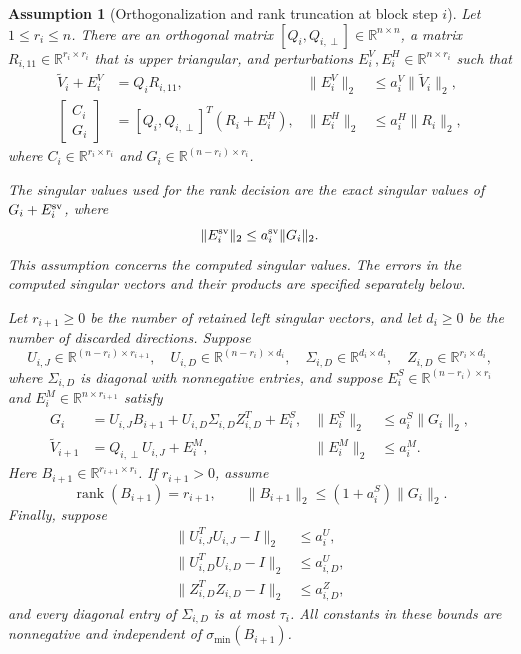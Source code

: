 \documentclass[11pt]{article}
\newtheorem{assumption}{Assumption}
\theoremstyle{definition}
\newcommand{\R}{\mathbb{R}}
\begin{document}
\begin{assumption}[Orthogonalization and rank truncation at block step $i$]
\label{ass:block-orthogonalization}
Let $1\le r_i\le n$.  There are an orthogonal matrix
$[Q_i,Q_{i,\perp}]\in\R^{n\times n}$, a matrix
$R_{i,11}\in\R^{r_i\times r_i}$ that is upper triangular, and perturbations
$E_i^V,E_i^H\in\R^{n\times r_i}$ such that
\begin{align}
 \widetilde V_i+E_i^V&=Q_iR_{i,11},
 &\|E_i^V\|_2&\le a_i^V\|\widetilde V_i\|_2,
 \label{eq:qr-relation}\\
 \begin{bmatrix}C_i\\G_i\end{bmatrix}
 &=[Q_i,Q_{i,\perp}]^T(R_i+E_i^H),
 &\|E_i^H\|_2&\le a_i^H\|R_i\|_2,
 \label{eq:reflector-relation}
\end{align}
where $C_i\in\R^{r_i\times r_i}$ and
$G_i\in\R^{(n-r_i)\times r_i}$.

The singular values used for the rank decision are the exact singular values
of $G_i+E_i^{\rm sv}$, where
\begin{equation}
 \|E_i^{\rm sv}\|_2\le a_i^{\rm sv}\|G_i\|_2.
 \label{eq:svd-value-backward-error}
\end{equation}
This assumption concerns the computed singular values.  The errors in the
computed singular vectors and their products are specified separately below.

Let $r_{i+1}\ge0$ be the number of retained left singular vectors, and let
$d_i\ge0$ be the number of discarded directions.  Suppose
\[
 U_{i,J}\in\R^{(n-r_i)\times r_{i+1}},\quad
 U_{i,D}\in\R^{(n-r_i)\times d_i},\quad
 \Sigma_{i,D}\in\R^{d_i\times d_i},\quad
 Z_{i,D}\in\R^{r_i\times d_i},
\]
where $\Sigma_{i,D}$ is diagonal with nonnegative entries, and suppose
$E_i^S\in\R^{(n-r_i)\times r_i}$ and
$E_i^M\in\R^{n\times r_{i+1}}$ satisfy
\begin{align}
 G_i&=U_{i,J}B_{i+1}
      +U_{i,D}\Sigma_{i,D}Z_{i,D}^T+E_i^S,
 &\|E_i^S\|_2&\le a_i^S\|G_i\|_2,
 \label{eq:svd-product-relation}\\
 \widetilde V_{i+1}&=Q_{i,\perp}U_{i,J}+E_i^M,
 &\|E_i^M\|_2&\le a_i^M.
 \label{eq:mapping-relation}
\end{align}
Here $B_{i+1}\in\R^{r_{i+1}\times r_i}$.  If $r_{i+1}>0$, assume
\begin{equation}
 \operatorname{rank}(B_{i+1})=r_{i+1},
 \qquad
 \|B_{i+1}\|_2\le(1+a_i^S)\|G_i\|_2.
 \label{eq:coupling-bound}
\end{equation}
Finally, suppose
\begin{align*}
 \|U_{i,J}^TU_{i,J}-I\|_2&\le a_i^U,\\
 \|U_{i,D}^TU_{i,D}-I\|_2&\le a_{i,D}^U,\\
 \|Z_{i,D}^TZ_{i,D}-I\|_2&\le a_{i,D}^Z,
\end{align*}
and every diagonal entry of $\Sigma_{i,D}$ is at most $\tau_i$.  All
constants in these bounds are nonnegative and independent of
$\sigma_{\min}(B_{i+1})$.
\end{assumption}
\end{document}
